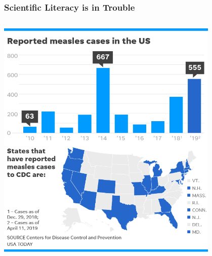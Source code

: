 \documentclass[10pt]{beamer}
\begin{document}
\begin{frame}
\frametitle{Scientific Literacy is in Trouble}

	\begin{columns}
		\begin{column}{0.7\textwidth}
			\begin{center}
				\includegraphics[width=0.8\textwidth]{figures/measles.png}
			\end{center}
		\end{column}
		

\end{columns}
\end{frame}
\end{document}
